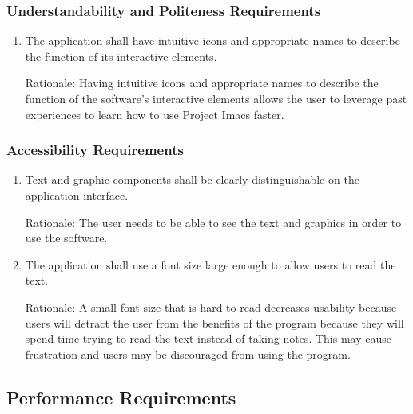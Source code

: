 \documentclass{article}
\begin{document}
\subsubsection{Understandability and Politeness Requirements}
\begin{enumerate}[UPR1]
\item The application shall have intuitive icons and appropriate names to describe the function of its interactive elements.

Rationale: Having intuitive icons and appropriate names to describe the function of the software's interactive elements allows the user to leverage past experiences to learn how to use Project Imacs faster.
\end{enumerate}

\subsubsection{Accessibility Requirements}
\begin{enumerate}[{A}CR1]
\item Text and graphic components shall be clearly distinguishable on the application interface.

Rationale: The user needs to be able to see the text and graphics in order to use the software.
\newpage
\item The application shall use a font size large enough to allow users to read the text.

Rationale: A small font size that is hard to read decreases usability because users will detract the user from the benefits of the program because they will spend time trying to read the text instead of taking notes. This may cause frustration and users may be discouraged from using the program.
\end{enumerate}

\subsection{Performance Requirements}
\end{document}
